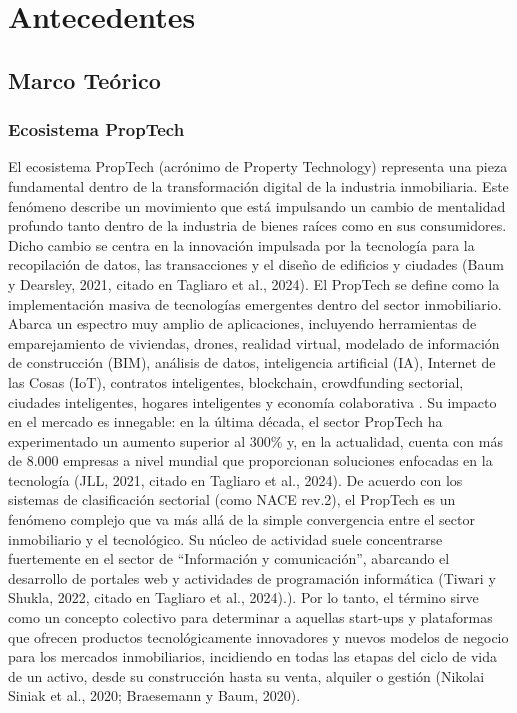 \chapter{Antecedentes}

\section{Marco Teórico}

\subsection{Ecosistema PropTech}

El ecosistema PropTech (acrónimo de Property Technology) representa una pieza fundamental dentro de la transformación digital de la industria inmobiliaria. Este fenómeno describe un movimiento que está impulsando un cambio de mentalidad profundo tanto dentro de la industria de bienes raíces como en sus consumidores. Dicho cambio se centra en la innovación impulsada por la tecnología para la recopilación de datos, las transacciones y el diseño de edificios y ciudades (Baum y Dearsley, 2021, citado en Tagliaro et al., 2024). El PropTech se define como la implementación masiva de tecnologías emergentes dentro del sector inmobiliario. Abarca un espectro muy amplio de aplicaciones, incluyendo herramientas de emparejamiento de viviendas, drones, realidad virtual, modelado de información de construcción (BIM), análisis de datos, inteligencia artificial (IA), Internet de las Cosas (IoT), contratos inteligentes, blockchain, crowdfunding sectorial, ciudades inteligentes, hogares inteligentes y economía colaborativa \parencite{SiniakEtAl2020}. Su impacto en el mercado es innegable: en la última década, el sector PropTech ha experimentado un aumento superior al 300\% y, en la actualidad, cuenta con más de 8.000 empresas a nivel mundial que proporcionan soluciones enfocadas en la tecnología (JLL, 2021, citado en Tagliaro et al., 2024). De acuerdo con los sistemas de clasificación sectorial (como NACE rev.2), el PropTech es un fenómeno complejo que va más allá de la simple convergencia entre el sector inmobiliario y el tecnológico. Su núcleo de actividad suele concentrarse fuertemente en el sector de ``Información y comunicación'', abarcando el desarrollo de portales web y actividades de programación informática (Tiwari y Shukla, 2022, citado en Tagliaro et al., 2024).). Por lo tanto, el término sirve como un concepto colectivo para determinar a aquellas start-ups y plataformas que ofrecen productos tecnológicamente innovadores y nuevos modelos de negocio para los mercados inmobiliarios, incidiendo en todas las etapas del ciclo de vida de un activo, desde su construcción hasta su venta, alquiler o gestión (Nikolai Siniak et al., 2020; Braesemann y Baum, 2020).


